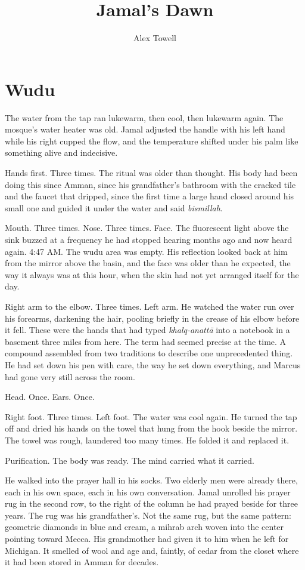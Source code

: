 \documentclass[11pt]{article}
\title{\textbf{Jamal's Dawn}}
\author{Alex Towell}
\date{}
\begin{document}
\maketitle
\thispagestyle{empty}

\section*{Wudu}

The water from the tap ran lukewarm, then cool, then lukewarm again. The mosque's water heater was old. Jamal adjusted the handle with his left hand while his right cupped the flow, and the temperature shifted under his palm like something alive and indecisive.

Hands first. Three times. The ritual was older than thought. His body had been doing this since Amman, since his grandfather's bathroom with the cracked tile and the faucet that dripped, since the first time a large hand closed around his small one and guided it under the water and said \emph{bismillah}.

Mouth. Three times. Nose. Three times. Face. The fluorescent light above the sink buzzed at a frequency he had stopped hearing months ago and now heard again. 4:47 AM. The wudu area was empty. His reflection looked back at him from the mirror above the basin, and the face was older than he expected, the way it always was at this hour, when the skin had not yet arranged itself for the day.

Right arm to the elbow. Three times. Left arm. He watched the water run over his forearms, darkening the hair, pooling briefly in the crease of his elbow before it fell. These were the hands that had typed \emph{khalq-anatt\=a} into a notebook in a basement three miles from here. The term had seemed precise at the time. A compound assembled from two traditions to describe one unprecedented thing. He had set down his pen with care, the way he set down everything, and Marcus had gone very still across the room.

Head. Once. Ears. Once.

Right foot. Three times. Left foot. The water was cool again. He turned the tap off and dried his hands on the towel that hung from the hook beside the mirror. The towel was rough, laundered too many times. He folded it and replaced it.

Purification. The body was ready. The mind carried what it carried.

He walked into the prayer hall in his socks. Two elderly men were already there, each in his own space, each in his own conversation. Jamal unrolled his prayer rug in the second row, to the right of the column he had prayed beside for three years. The rug was his grandfather's. Not the same rug, but the same pattern: geometric diamonds in blue and cream, a mihrab arch woven into the center pointing toward Mecca. His grandmother had given it to him when he left for Michigan. It smelled of wool and age and, faintly, of cedar from the closet where it had been stored in Amman for decades.
\end{document}
